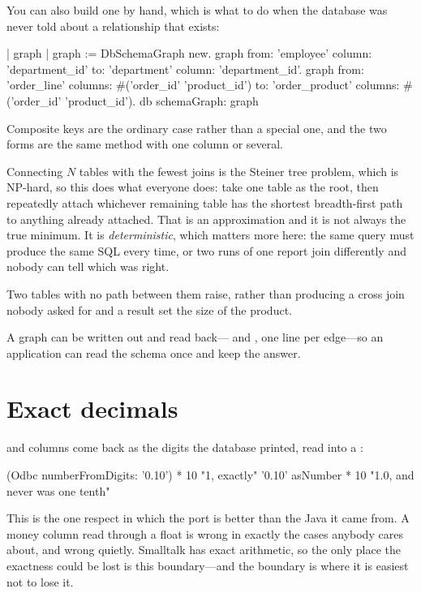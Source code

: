 You can also build one by hand, which is what to do when the database was
never told about a relationship that exists:

\begin{st}
| graph |
graph := DbSchemaGraph new.
graph from: 'employee' column: 'department_id'
       to: 'department' column: 'department_id'.
graph from: 'order_line' columns: #('order_id' 'product_id')
       to: 'order_product' columns: #('order_id' 'product_id').
db schemaGraph: graph
\end{st}

Composite keys are the ordinary case rather than a special one, and the two
forms are the same method with one column or several.

Connecting $N$ tables with the fewest joins is the Steiner tree problem, which
is NP-hard, so this does what everyone does: take one table as the root, then
repeatedly attach whichever remaining table has the shortest breadth-first
path to anything already attached. That is an approximation and it is not
always the true minimum. It is \emph{deterministic}, which matters more here:
the same query must produce the same SQL every time, or two runs of one report
join differently and nobody can tell which was right.

Two tables with no path between them raise, rather than producing a cross join
nobody asked for and a result set the size of the product.

A graph can be written out and read back--- and ,
one line per edge---so an application can read the schema once and keep the
answer.

\section{Exact decimals}

 and  columns come back as the digits the database
printed, read into a :

\begin{st}
(Odbc numberFromDigits: '0.10') * 10        "1, exactly"
'0.10' asNumber * 10                        "1.0, and never was one tenth"
\end{st}

This is the one respect in which the port is better than the Java it came
from. A money column read through a float is wrong in exactly the cases
anybody cares about, and wrong quietly. Smalltalk has exact arithmetic, so the
only place the exactness could be lost is this boundary---and the boundary is
where it is easiest not to lose it.

